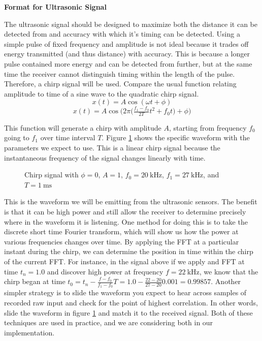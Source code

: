 \documentclass{article}
\begin{document}
      \textbf{Format for Ultrasonic Signal}

      The ultrasonic signal should be designed to maximize both the distance it can be detected from and accuracy with which it's timing can be detected. Using a simple pulse of fixed frequency and amplitude is not ideal because it trades off energy transmitted (and thus distance) with accuracy. This is because a longer pulse contained more energy and can be detected from further, but at the same time the receiver cannot distinguish timing within the length of the pulse. Therefore, a chirp signal will be used. Compare the usual function relating amplitude to time of a sine wave to the quadratic chirp signal.
      $$ x(t) = A\cos(\omega t + \phi) $$
      $$ x(t) = A\cos\bigg(2\pi\Big(\tfrac{f_1 - f_0}{2T}t^2+f_0t\Big) + \phi\bigg) $$

      This function will generate a chirp with amplitude $A$, starting from frequency $f_0$ going to $f_1$ over time interval $T$. Figure \ref{fig:chirp} shows the specific waveform with the parameters we expect to use. This is a linear chirp signal because the instantaneous frequency of the signal changes linearly with time.

      \begin{figure}[H]
        \centering
        \label{fig:chirp}
        \caption{Chirp signal with $\phi=0$, $A=1$, $f_0=\SI{20}{\kilo\hertz}$, $f_1=\SI{27}{\kilo\hertz}$, and $T=\SI{1}{\milli\second}$}
      \end{figure}

        This is the waveform we will be emitting from the ultrasonic sensors. The benefit is that it can be high power and still allow the receiver to determine precisely where in the waveform it is listening. One method for doing this is to take the discrete short time Fourier transform, which will show us how the power at various frequencies changes over time. By applying the FFT at a particular instant during the chirp, we can determine the position in time within the chirp of the current FFT. For instance, in the signal above if we apply and FFT at time $t_n=1.0$ and discover high power at frequency $f=\SI{22}{\kilo\hertz}$, we know that the chirp began at time $t_0 = t_n - \tfrac{f - f_0}{f_1 - f_0}T = 1.0 - \tfrac{22-20}{27-20}0.001 = 0.99857$. Another simpler strategy is to slide the waveform you expect to hear across samples of recorded raw input and check for the point of highest correlation. In other words, slide the waveform in figure \ref{fig:chirp} and match it to the received signal. Both of these techniques are used in practice, and we are considering both in our implementation.
\end{document}

